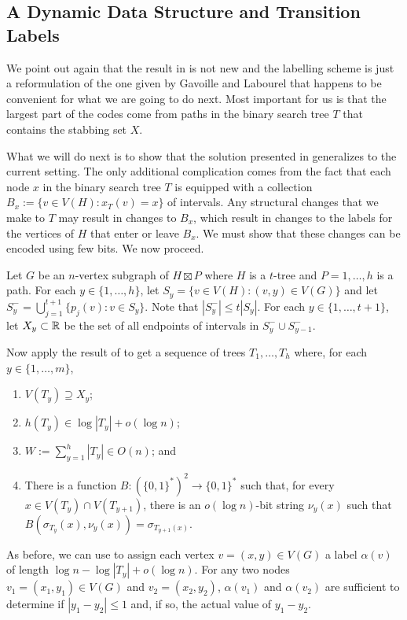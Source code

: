\documentclass[kpfonts]{patmorin}
\newcommand{\snote}[1]{\fcolorbox{red}{yellow}{#1}}
\begin{document}
\subsection{A Dynamic Data Structure and Transition Labels}

We point out again that the result in  is not new and the labelling scheme is just a reformulation of the one given by Gavoille and Labourel \cite{gavoille.labourel:shorter} that happens to be convenient for what we are going to do next. Most important for us is that the largest part of the codes come from paths in the binary search tree $T$ that contains the stabbing set $X$.  

What we will do next is to show that the solution presented in  generalizes to the current setting.  The only additional complication comes from the fact that each node $x$ in the binary search tree $T$ is equipped with a collection $B_x:=\{v\in V(H):x_T(v)=x\}$ of intervals.  Any structural changes that we make to $T$ may result in changes to $B_x$, which result in changes to the labels for the vertices of $H$ that enter or leave $B_x$.  We must show that these changes can be encoded using few bits.  We now proceed.

Let $G$ be an $n$-vertex subgraph of $H\boxtimes P$ where $H$ is a $t$-tree and $P=1,\ldots,h$ is a path. For each $y\in\{1,\ldots,h\}$, let $S_y=\{v\in V(H): (v,y)\in V(G)\}$ \snote{Consistency: $S_y$ was $L_y$ in \secref{pxp}} and let $S^-_y=\bigcup_{j=1}^{t+1}\{p_j(v):v\in S_y\}$.  Note that $|S^-_y|\le t|S_y|$. For each $y\in\{1,\ldots,t+1\}$, let $X_y\subset\mathbb{R}$ be the set of all endpoints of intervals in $S^-_y\cup S^-_{y-1}$.

Now apply the result of  to get a sequence of trees $T_1,\ldots,T_h$ where, for each $y\in\{1,\ldots,m\}$, 
\begin{enumerate}[(PRX1)]
  \item $V(T_y)\supseteq X_y$;
  \item $h(T_y)\in \log |T_y| + o(\log n)$;
  \item $W:=\sum_{y=1}^h |T_y|\in O(n)$; and
  \item There is a function $B:(\{0,1\}^*)^2\to\{0,1\}^*$ such that, for every $x\in V(T_y)\cap V(T_{y+1})$, there is an $o(\log n)$-bit string $\nu_y(x)$ such that $B(\sigma_{T_y}(x),\nu_y(x))=\sigma_{T_{y+1}(x)}$.
\end{enumerate}

As before, we can use  to assign each vertex $v=(x,y)\in V(G)$ a label $\alpha(v)$ of length $\log n - \log|T_y| + o(\log n)$. For any two nodes $v_1=(x_1,y_1)\in V(G)$ and $v_2=(x_2,y_2)$, $\alpha(v_1)$ and $\alpha(v_2)$ are sufficient to determine if $|y_1-y_2|\le 1$ and, if so, the actual value of $y_1-y_2$.
\end{document}
